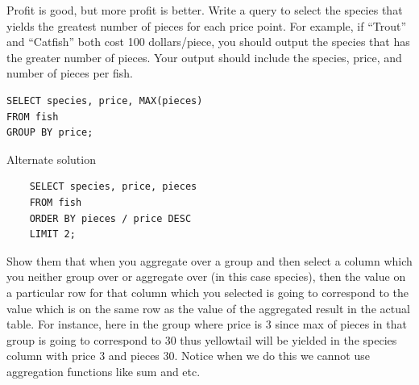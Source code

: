 \begin{blocksection}
Profit is good, but more profit is better. Write a query to select the species that yields the greatest number of pieces for each price point. For example, if ``Trout'' and ``Catfish'' both cost 100 dollars/piece, you should output the species that has the greater number of pieces. Your output should include the species, price, and number of pieces per fish.

\begin{solution}[0.7in]
\begin{lstlisting}
SELECT species, price, MAX(pieces) 
FROM fish 
GROUP BY price;
\end{lstlisting}
\end{solution}
\begin{solution}
    Alternate solution
    \begin{lstlisting}
    SELECT species, price, pieces 
    FROM fish 
    ORDER BY pieces / price DESC 
    LIMIT 2;
    \end{lstlisting}
\end{solution}
\end{blocksection}

\begin{meta}
    Show them that when you aggregate over a group and then select a column which you neither group over or aggregate over (in this case species), then the value on a particular row for that column which you selected is going to correspond to the value which is on the same row as the value of the aggregated result in the actual table. For instance, here in the group where price is 3 since max of pieces in that group is going to correspond to 30 thus yellowtail will be yielded in the species column with price 3 and pieces 30. Notice when we do this we cannot use aggregation functions like sum and etc.
\end{meta}